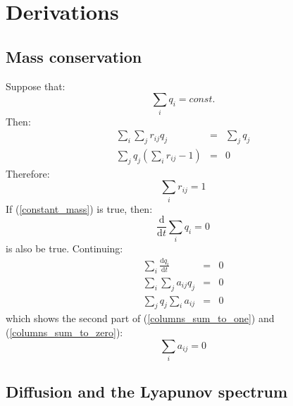 \documentclass{article}
\begin{document}
\section{Derivations}

\subsection{Mass conservation}

\label{mass_conservation_derivation}

Suppose that:
\begin{equation}
	\sum_i q_i = const.
	\label{constant_mass}
\end{equation}
Then:
\begin{eqnarray}
	\sum_i \sum_j r_{ij} q_j & = & \sum_j q_j \\
	\sum_j q_j \left ( \sum_i r_{ij} - 1 \right ) & = & 0
\end{eqnarray}
Therefore:
\begin{equation}
	\sum_i r_{ij} = 1
\end{equation}
If (\ref{constant_mass}) is true, then:
\begin{equation}
	\frac{\mathrm d}{\mathrm d t}\sum_i q_i = 0
\end{equation}
is also be true. Continuing:
\begin{eqnarray}
	\sum_i \frac{\mathrm d q_i}{\mathrm d t} & = & 0 \\
\sum_i \sum_j a_{ij} q_j & = & 0 \\
\sum_j q_j \sum_i a_{ij} & = & 0
\end{eqnarray}
which shows the second part of (\ref{columns_sum_to_one}) and 
(\ref{columns_sum_to_zero}):
\begin{equation}
	\sum_i a_{ij} = 0
\end{equation}

\subsection{Diffusion and the Lyapunov spectrum}

\label{Lyapunov_exponents_less_than_zero}
\end{document}
